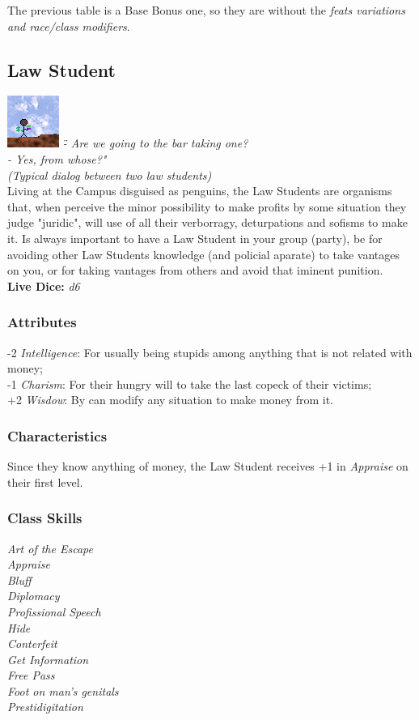 \documentclass[ letterpaper,12pt]{article}
\begin{document}
The previous table is a Base Bonus one, so they are without the {\it feats variations and race/class modifiers}.\\

\subsection{Law Student}
\includegraphics{../data/classes/Img/direito.png}
{\it \" - Are we going to the bar taking one?\\
        - Yes, from whose?"\\(Typical dialog between two law students)}\\

Living at the Campus disguised as penguins, the Law Students are organisms
that, when perceive the minor possibility to make profits by some situation
they judge "juridic", will use of all their verborragy, deturpations and
sofisms to make it. Is always important to have a Law Student in your group
(party), be for avoiding other Law Students knowledge (and policial aparate) to
take vantages on you, or for taking vantages from others and avoid that iminent
punition.\\

{\bf Live Dice:} {\it d6}

\subsubsection{Attributes}
-2 {\it Intelligence}: For usually being stupids among anything that is not related with money;\\
-1 {\it Charism}: For their hungry will to take the last copeck of their victims;\\
+2 {\it Wisdow}: By can modify any situation to make money from it.\\

\subsubsection{Characteristics}

Since they know anything of money, the Law Student receives +1 in {\it Appraise} on their first level.

\subsubsection{Class Skills}
{\it
Art of the Escape\\
Appraise\\
Bluff\\
Diplomacy\\
Profissional Speech\\
Hide\\
Conterfeit\\
Get Information\\
Free Pass\\
Foot on man's genitals\\
Prestidigitation}
\end{document}
